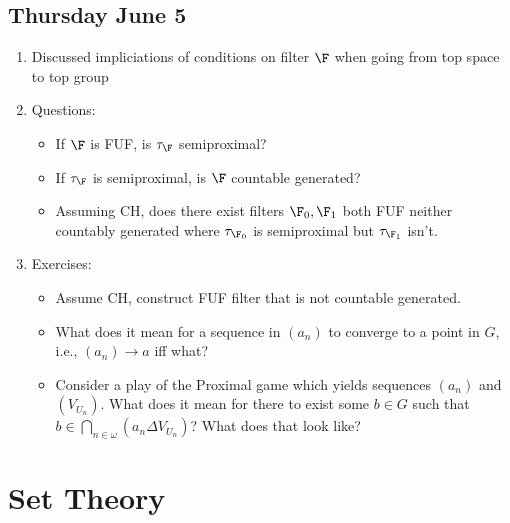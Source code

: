 \documentclass{article}
\begin{document}
\subsection*{Thursday June 5}
\begin{enumerate}
    \item Discussed impliciations of conditions on filter \(\F\) when going from top space to top group 
    \item Questions:
    \begin{itemize}
        \item If \(\F\) is FUF, is \(\tau_{\F}\) semiproximal?
        \item If \(\tau_{\F}\) is semiproximal, is \(\F\) countable generated?
        \item Assuming CH, does there exist filters \(\F_0, \F_1\) both FUF neither countably generated where \(\tau_{\F_0}\) is semiproximal but \(\tau_{\F_1}\) isn't.
    \end{itemize}    
    \item Exercises: 
    \begin{itemize}
        \item Assume CH, construct FUF filter that is not countable generated.
        \item What does it mean for a sequence in \((a_n)\) to converge to a point in \(G\), i.e., \((a_n)\to a\) iff what?
        \item Consider a play of the Proximal game which yields sequences \((a_n)\) and \((V_{U_n})\). What does it mean for there to exist some \(b \in G\) such that \(b \in \bigcap_{n \in \omega}(a_n \Delta V_{U_n})\)? What does that look like?
    \end{itemize}
    \end{enumerate}
\section{Set Theory}
\end{document}
